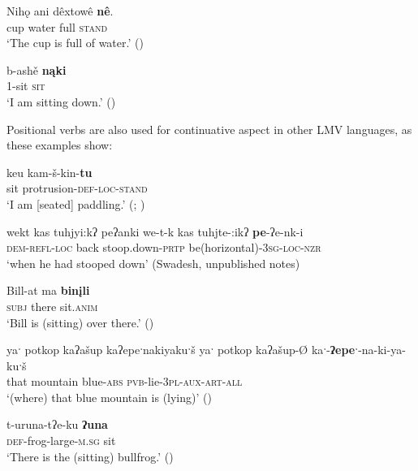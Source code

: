 \documentclass[output=paper]{LSP/langsci}
\begin{document}
\ea
\settowidth{}
\gll	Nihǫ 	ani 	dêxtowê \textbf{nê}.\\
		cup water full  \textsc{stand}\\ 
\glt	`The cup is full of water.' (\citealt[166]{DorseySwanton1912})
\z
		
\ea
\settowidth{}
\gll	b-ashě \textbf{nąki}\\
		1-sit \textsc{sit}\\ 
\glt	`I am sitting down.' (\citealt[20]{Rankin2002})
\z

Positional verbs are also used for continuative aspect in other LMV languages, as these examples show:

\ea
\settowidth{}
\gll	keu kam-š-kin-\textbf{tu}\\
		sit protrusion-\textsc{def-loc-stand}\\ 
\glt `I am [seated] paddling.' (\citealt[61]{GatschetSwanton1932}; \citealt[27]{Watkins1976})
\z

\ea	
\settowidth{}
wekt kas tuhjyi:kʔ peʔanki 
\gll		we-t-k 	 kas 	 tuhjte-:ikʔ 	 \textbf{pe}-ʔe-nk-i\\
		\textsc{dem-refl-loc} back	  stoop.down-\textsc{prtp} be(horizontal)-\textsc{3sg-loc-nzr}\\
\glt	`when he had stooped down' (Swadesh, unpublished notes)
\z

\ea
\settowidth{}
\gll	Bill-at ma \textbf{binįli}\\
	 \textsc{subj} there sit.\textsc{anim}\\ 
\glt `Bill is (sitting) over there.' (\citealt[21]{Watkins1976})
\z
		
\ea	
\settowidth{} 
yaˑ potkop kaʔašup kaʔepeˑnakiyakuˑš\footnotemark {}
\gll		yaˑ potkop kaʔašup-Ø kaˑ-\textbf{ʔepeˑ}-na-ki-ya-kuˑš\\
		that mountain blue-\textsc{abs} \textsc{pvb}-lie-\textsc{3pl-aux-art-all}\\
\glt	`(where) that blue mountain is (lying)' (\citealt[438]{Kimball2005})
\z

\ea
\settowidth{}
\gll	t-uruna-tʔe-ku 	\textbf{ʔuna}\\
 \textsc{def}-frog-large-\textsc{m.sg} sit\\ 
\glt `There is the (sitting) bullfrog.' (\citealt[26]{Watkins1976})
\z
\end{document}
